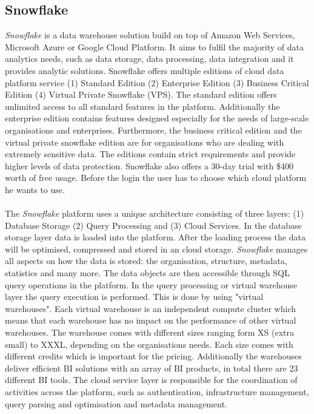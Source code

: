 \documentclass[../paper.tex]{subfiles}
\begin{document}
\subsection{Snowflake}
\textit{Snowflake} is a data warehouse solution build on top of Amazon Web Services, Microsoft Azure or Google Cloud Platform. It aims to fulfil the majority of data analytics needs, such as data storage, data processing, data integration and it provides analytic solutions. Snowflake offers multiple editions of cloud data platform service (1) Standard Edition (2) Enterprise Edition (3) Business Critical Edition (4) Virtual Private Snowflake (VPS).
The standard  edition offers unlimited access to all standard features in the platform. Additionally the enterprise edition contains features designed especially for the needs of large-scale organisations and enterprises.
Furthermore, the business critical edition and the virtual private snowflake edition are for organisations who are dealing with extremely sensitive data. The editions contain strict requirements and provide higher levels of data protection. Snowflake also offers a 30-day trial with \$400 worth of free usage. Before the login the user has to choose which cloud platform he wants to use.
\\ \\
The \textit{Snowflake} platform uses a unique architecture consisting of three layers: (1) Database Storage (2) Query Processing and (3) Cloud Services. In the database storage layer data is loaded into the platform. After the loading process the data will be optimised, compressed and stored in an cloud storage.
\textit{Snowflake} manages all aspects on how the data is stored: the organisation, structure, metadata, statistics and many more. The data objects are then accessible through SQL query operations in the platform.
In the query processing or virtual warehouse layer the query execution is performed. This is done by using "virtual warehouses". Each virtual warehouse is an independent compute cluster which means that each warehouse has no impact on the performance of other virtual warehouses. The warehouse comes with different sizes ranging form XS (extra small) to XXXL, depending on the organisations needs. Each size comes with different credits which is important for the pricing. Additionally the warehouses deliver efficient BI solutions with an array of BI products, in total there are 23 different BI tools. The cloud service layer is responsible for the coordination of activities across the platform, such as authentication, infrastructure management, query parsing and optimisation and metadata management.
\end{document}
